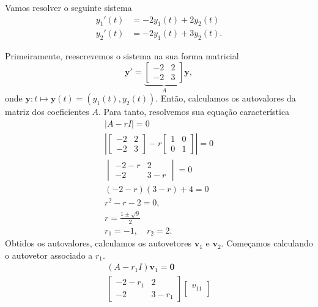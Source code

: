 \begin{ex}
  Vamos resolver o seguinte sistema
  \begin{align}\label{eq:ex_edosis1_eqh_avd}
    y_1'(t) &= -2y_1(t) + 2y_2(t) \\
    y_2'(t) &= -2y_1(t) + 3y_2(t).
  \end{align}

  Primeiramente, reescrevemos o sistema na sua forma matricial
  \begin{equation}
    \pmb{y}' =
    \underbrace{\begin{bmatrix}
      -2 & 2 \\
      -2 & 3
    \end{bmatrix}}_{A}
    \pmb{y},
  \end{equation}
  onde $\pmb{y}: t\mapsto \pmb{y}(t) = (y_1(t), y_2(t))$. Então, calculamos os autovalores da matriz dos coeficientes $A$. Para tanto, resolvemos sua equação característica
  \begin{gather}
    |A-rI| = 0 \\
    \left|
      \begin{bmatrix}
        -2 & 2 \\
        -2 & 3
      \end{bmatrix}
      -r
      \begin{bmatrix}
        1 & 0 \\
        0 & 1
      \end{bmatrix}
    \right| = 0 \\
    \begin{vmatrix}
      -2 - r & 2 \\
      -2 & 3 - r
    \end{vmatrix} = 0 \\
    (-2-r)(3-r) + 4 = 0 \\
    r^2 - r - 2 =  0,\\
    r = \frac{1 \pm \sqrt{9}}{2} \\
    r_1=-1,\quad r_2=2.
  \end{gather}
  Obtidos os autovalores, calculamos os autovetores $\pmb{v}_1$ e $\pmb{v}_2$. Começamos calculando o autovetor associado a $r_1$.
  \begin{gather}
    (A-r_1I)\pmb{v}_1 = \pmb{0} \\
    \begin{bmatrix}
      -2-r_1 & 2 \\
      -2 & 3-r_1
    \end{bmatrix}
    \begin{bmatrix}
      v_{11} \\

\end{bmatrix}
\end{gather}
\end{ex}
